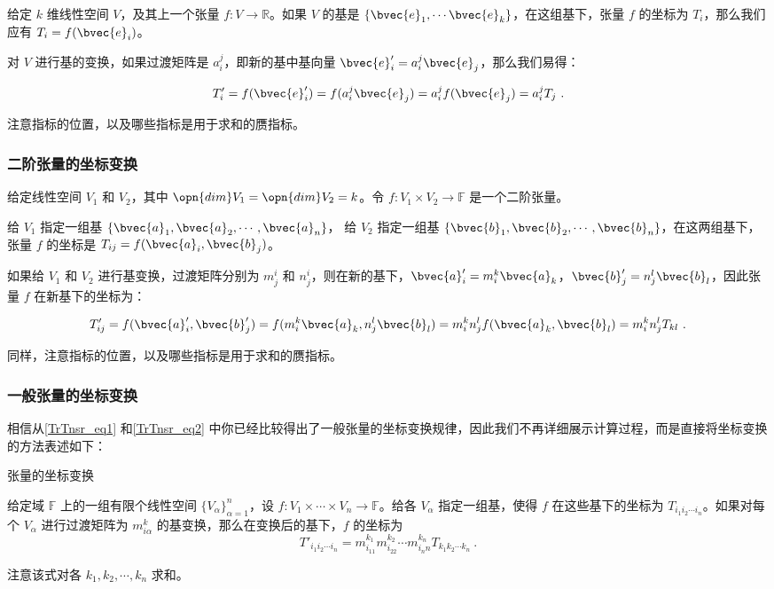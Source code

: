 给定 $k$ 维线性空间 $V$，及其上一个张量 $f:V\rightarrow\mathbb{R}$。如果 $V$ 的基是 $\{\bvec{e}_1, \cdots\bvec{e}_k\}$，在这组基下，张量 $f$ 的坐标为 $T_{i}$，那么我们应有 $T_{i}=f(\bvec{e}_i)$。

对 $V$ 进行基的变换，如果过渡矩阵是 $a_{i}^j$，即新的基中基向量 $\bvec{e}'_{i}=a_{i}^j\bvec{e}_j$，那么我们易得：

\begin{equation}\label{TrTnsr_eq1}
T'_{i}=f(\bvec{e}'_i)=f(a_{i}^j\bvec{e}_j)=a_{i}^jf(\bvec{e}_j)=a_{i}^jT_{j}~.
\end{equation}

注意指标的位置，以及哪些指标是用于求和的赝指标。

\subsubsection{二阶张量的坐标变换}

给定线性空间 $V_1$ 和 $V_2$，其中 $\opn{dim}V_1=\opn{dim}V_2=k$。令 $f:V_1\times V_2\rightarrow\mathbb{F}$ 是一个二阶张量。

给 $V_1$ 指定一组基 $\{\bvec{a}_1, \bvec{a}_2, \cdots, \bvec{a}_n\}$， 给 $V_2$ 指定一组基 $\{\bvec{b}_1, \bvec{b}_2, \cdots, \bvec{b}_n\}$，在这两组基下，张量 $f$ 的坐标是 $T_{ij}=f(\bvec{a}_i, \bvec{b}_j)$。

如果给 $V_1$ 和 $V_2$ 进行基变换，过渡矩阵分别为 $m^{i}_j$ 和 $n^{i}_j$，则在新的基下，$\bvec{a}'_i=m^{k}_i\bvec{a}_k$，$\bvec{b}'_j=n^{l}_j\bvec{b}_l$，因此张量 $f$ 在新基下的坐标为：

\begin{equation}\label{TrTnsr_eq2}
T'_{ij}=f(\bvec{a}'_i, \bvec{b}'_j)=f(m^{k}_i\bvec{a}_k, n^{l}_j\bvec{b}_l)=m^{k}_in^{l}_jf(\bvec{a}_k, \bvec{b}_l)=m^{k}_in^{l}_jT_{kl}~.
\end{equation}

同样，注意指标的位置，以及哪些指标是用于求和的赝指标。

\subsubsection{一般张量的坐标变换}

相信从\autoref{TrTnsr_eq1} 和\autoref{TrTnsr_eq2} 中你已经比较得出了一般张量的坐标变换规律，因此我们不再详细展示计算过程，而是直接将坐标变换的方法表述如下：

\begin{theorem}{张量的坐标变换}\label{TrTnsr_the1}

给定域 $\mathbb{F}$ 上的一组有限个线性空间 $\{V_\alpha\}^n_{\alpha=1}$，设 $f:V_1\times\cdots\times V_n\rightarrow\mathbb{F}$。给各 $V_\alpha$ 指定一组基，使得 $f$ 在这些基下的坐标为 $T_{i_1i_2\cdots i_n}$。如果对每个 $V_\alpha$ 进行过渡矩阵为 $m^k_{i\alpha}$ 的基变换，那么在变换后的基下，$f$ 的坐标为
\begin{equation}
T'_{i_1i_2\cdots i_n}=m^{k_1}_{i_11}m^{k_2}_{i_22}\cdots m^{k_n}_{i_nn}T_{k_1k_2\cdots k_n}~.
\end{equation}

注意该式对各 $k_1, k_2, \cdots, k_n$ 求和。
\end{theorem}

